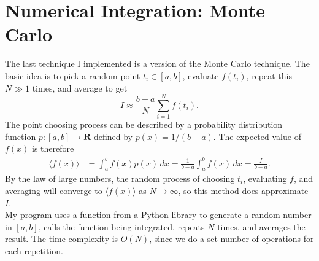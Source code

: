 \documentclass[11pt]{article}
\theoremstyle{plain}
\begin{document}
\section{Numerical Integration: Monte Carlo}
The last technique I implemented is a version of the Monte Carlo technique. The basic idea is to pick a random point $t_i\in[a,b]$, evaluate $f(t_i)$, repeat this $N \gg 1$ times, and average to get
\begin{equation*}
	I \approx \frac{b-a}{N} \sum_{i=1}^N f(t_i).
\end{equation*}
The point choosing process can be described by a probability distribution function $p:[a,b]\to \mathbf{R}$ defined by $p(x) = 1/(b-a)$. The expected value of $f(x)$ is therefore 
\begin{align*}
	\langle f(x)\rangle &= \int_a^b f(x) p(x)\, dx = \frac{1}{b-a}\int_a^b f(x)\, dx = \frac{I}{b-a}.
\end{align*}
By the law of large numbers, the random process of choosing $t_i$, evaluating $f$, and averaging will converge to $\langle f(x)\rangle$ as $N\to\infty$, so this method does approximate $I$. \\
\indent My program uses a function from a Python library to generate a random number in $[a,b]$, calls the function being integrated, repeats $N$ times, and averages the result. The time complexity is $O(N)$, since we do a set number of operations for each repetition.
\end{document}
